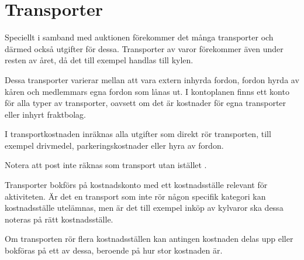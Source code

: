 				\section{Transporter}
				
				Speciellt i samband med auktionen förekommer det många transporter och därmed också utgifter för dessa. Transporter av varor förekommer även under resten av året, då det till exempel handlas till kylen.
		
		Dessa transporter varierar mellan att vara extern inhyrda fordon, fordon hyrda av kåren och medlemmars egna fordon som lånas ut. I kontoplanen finns ett konto för alla typer av transporter, oavsett om det är kostnader för egna transporter eller inhyrt fraktbolag.
		
		I transportkostnaden inräknas alla utgifter som direkt rör transporten, till exempel drivmedel, parkeringskostnader eller hyra av fordon.
		
		Notera att post inte räknas som transport utan istället .
		
					\begin{redovisning}
						Transporter bokförs på kostnadskonto  med ett kostnadsställe relevant för aktiviteten. Är det en transport som inte rör någon specifik kategori kan kostnadsställe utelämnas, men är det till exempel inköp av kylvaror ska dessa noteras på rätt kostnadsställe.
		
		Om transporten rör flera kostnadsställen kan antingen kostnaden delas upp eller bokföras på ett av dessa, beroende på hur stor kostnaden är.
					\end{redovisning}
				